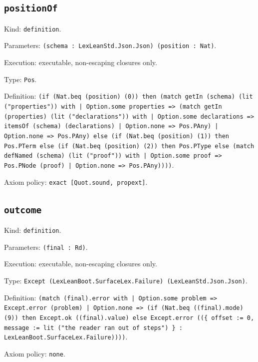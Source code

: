\documentclass[11pt]{article}
\begin{document}
\subsection*{\texttt{positionOf}}
\noindent Kind: \texttt{definition}.\par
\noindent Parameters: \texttt{(schema : LexLeanStd.Json.Json) (position : Nat)}.\par
\noindent Execution: executable, non-escaping closures only.\par
\noindent Type: \texttt{Pos}.\par
\noindent Definition: \texttt{(if (Nat.beq (position) (0)) then (match getIn (schema) (lit ("properties")) with | Option.some properties => (match getIn (properties) (lit ("declarations")) with | Option.some declarations => itemsOf (schema) (declarations) | Option.none => Pos.PAny) | Option.none => Pos.PAny) else (if (Nat.beq (position) (1)) then Pos.PTerm else (if (Nat.beq (position) (2)) then Pos.PType else (match defNamed (schema) (lit ("proof")) with | Option.some proof => Pos.PNode (proof) | Option.none => Pos.PAny))))}.\par
\noindent Axiom policy: \texttt{exact [Quot.sound, propext]}.\par
\subsection*{\texttt{outcome}}
\noindent Kind: \texttt{definition}.\par
\noindent Parameters: \texttt{(final : Rd)}.\par
\noindent Execution: executable, non-escaping closures only.\par
\noindent Type: \texttt{Except (LexLeanBoot.SurfaceLex.Failure) (LexLeanStd.Json.Json)}.\par
\noindent Definition: \texttt{(match (final).error with | Option.some problem => Except.error (problem) | Option.none => (if (Nat.beq ((final).mode) (9)) then Except.ok ((final).value) else Except.error ((\{ offset := 0, message := lit ("the reader ran out of steps") \} : LexLeanBoot.SurfaceLex.Failure))))}.\par
\noindent Axiom policy: \texttt{none}.\par
\end{document}
